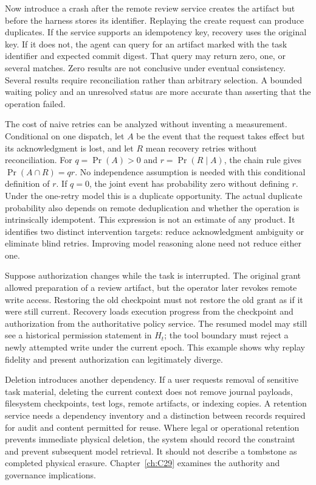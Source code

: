 Now introduce a crash after the remote review service creates the artifact but before the harness stores its identifier. Replaying the create request can produce duplicates. If the service supports an idempotency key, recovery uses the original key. If it does not, the agent can query for an artifact marked with the task identifier and expected commit digest. That query may return zero, one, or several matches. Zero results are not conclusive under eventual consistency. Several results require reconciliation rather than arbitrary selection. A bounded waiting policy and an unresolved status are more accurate than asserting that the operation failed.

The cost of naive retries can be analyzed without inventing a measurement. Conditional on one dispatch, let $A$ be the event that the request takes effect but its acknowledgment is lost, and let $R$ mean recovery retries without reconciliation. For $q=\Pr(A)>0$ and $r=\Pr(R\mid A)$, the chain rule gives $\Pr(A\cap R)=qr$. No independence assumption is needed with this conditional definition of $r$. If $q=0$, the joint event has probability zero without defining $r$. Under the one-retry model this is a duplicate opportunity. The actual duplicate probability also depends on remote deduplication and whether the operation is intrinsically idempotent. This expression is not an estimate of any product. It identifies two distinct intervention targets: reduce acknowledgment ambiguity or eliminate blind retries. Improving model reasoning alone need not reduce either one.

Suppose authorization changes while the task is interrupted. The original grant allowed preparation of a review artifact, but the operator later revokes remote write access. Restoring the old checkpoint must not restore the old grant as if it were still current. Recovery loads execution progress from the checkpoint and authorization from the authoritative policy service. The resumed model may still see a historical permission statement in $H_t$; the tool boundary must reject a newly attempted write under the current epoch. This example shows why replay fidelity and present authorization can legitimately diverge.

Deletion introduces another dependency. If a user requests removal of sensitive task material, deleting the current context does not remove journal payloads, filesystem checkpoints, test logs, remote artifacts, or indexing copies. A retention service needs a dependency inventory and a distinction between records required for audit and content permitted for reuse. Where legal or operational retention prevents immediate physical deletion, the system should record the constraint and prevent subsequent model retrieval. It should not describe a tombstone as completed physical erasure. Chapter~\ref{ch:C29} examines the authority and governance implications.

